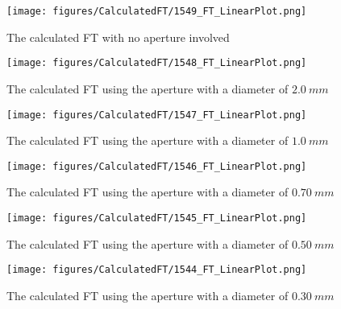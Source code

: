 \begin{figure}[H]
    \centering
    \begin{minipage}[t]{0.45\textwidth}
        \centering
        \texttt{[image: figures/CalculatedFT/1549\_FT\_LinearPlot.png]}
        \caption{The calculated FT with no aperture involved}
    \end{minipage}%
    \hspace{0.5cm}
    \begin{minipage}[t]{0.45\textwidth}
        \centering
        \texttt{[image: figures/CalculatedFT/1548\_FT\_LinearPlot.png]}
        \caption{The calculated FT using the aperture with a diameter of $2.0 \ \si{mm}$}
    \end{minipage}%
    \vspace{1.5cm}
    \begin{minipage}[t]{0.45\textwidth}
        \centering
        \texttt{[image: figures/CalculatedFT/1547\_FT\_LinearPlot.png]}
        \caption{The calculated FT using the aperture with a diameter of $1.0 \ \si{mm}$}
    \end{minipage}%
    \hspace{0.5cm}
    \begin{minipage}[t]{0.45\textwidth}
        \centering
        \texttt{[image: figures/CalculatedFT/1546\_FT\_LinearPlot.png]}
        \caption{The calculated FT using the aperture with a diameter of $0.70 \ \si{mm}$}
    \end{minipage}%
    \vspace{1.5cm}
    \begin{minipage}[t]{0.45\textwidth}
        \centering
        \texttt{[image: figures/CalculatedFT/1545\_FT\_LinearPlot.png]}
        \caption{The calculated FT using the aperture with a diameter of $0.50 \ \si{mm}$}
    \end{minipage}%
    \hspace{0.5cm}
    \begin{minipage}[t]{0.45\textwidth}
        \centering
        \texttt{[image: figures/CalculatedFT/1544\_FT\_LinearPlot.png]}
        \caption{The calculated FT using the aperture with a diameter of $0.30 \ \si{mm}$}
    \end{minipage}%
\end{figure}